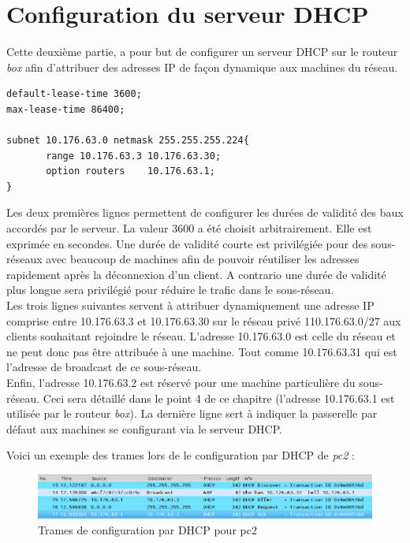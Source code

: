 \documentclass[12pt,a4paper,utf8x]{report}
\begin{document}
\section{Configuration du serveur DHCP}
Cette deuxième partie, a pour but de configurer un serveur DHCP sur le routeur \emph{box} afin d'attribuer des adresses IP de façon dynamique aux machines du réseau.
\begin{verbatim}
default-lease-time 3600;
max-lease-time 86400;

subnet 10.176.63.0 netmask 255.255.255.224{
       range 10.176.63.3 10.176.63.30;
       option routers    10.176.63.1;
}
\end{verbatim}
Les deux premières lignes permettent de configurer les durées de validité des baux accordés par le serveur.
La valeur 3600 a été choisit arbitrairement. Elle est exprimée en secondes. Une durée de validité courte est privilégiée pour des sous-réseaux avec beaucoup de machines afin de pouvoir réutiliser les adresses rapidement après la déconnexion d'un client. A contrario une durée de validité plus longue sera privilégié pour réduire le trafic dans le sous-réseau.\\
Les trois lignes suivantes servent à attribuer dynamiquement une adresse IP comprise entre 10.176.63.3 et 10.176.63.30 sur le réseau privé 110.176.63.0/27 aux clients souhaitant rejoindre le réseau.
L'adresse 10.176.63.0 est celle du réseau et ne peut donc pas être attribuée à une machine. Tout comme 10.176.63.31 qui est l'adresse de broadcast de ce sous-réseau.\\
Enfin, l'adresse 10.176.63.2 est réservé pour une machine particulière du sous-réseau. Ceci sera détaillé dans le point 4 de ce chapitre (l'adresse 10.176.63.1 est utilisée par le routeur \emph{box}).
La dernière ligne sert à indiquer la passerelle par défaut aux machines se configurant via le serveur DHCP.

Voici un exemple des trames lors de le configuration par DHCP de \emph{pc2} :

\begin{figure}[h!]

	\includegraphics[width=1\textwidth]{TrameDHCP.png}
	\centering
	\caption{Trames de configuration par DHCP pour pc2}

\end{figure}
\end{document}
